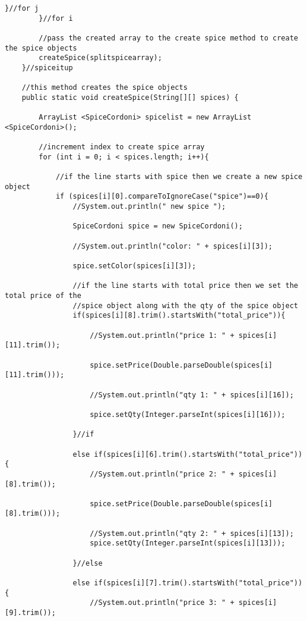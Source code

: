 \documentclass[letterpaper, 10pt,DIV=13]{scrartcl}
\numberwithin{equation}{section} %
\numberwithin{figure}{section} %
\numberwithin{table}{section} %
\begin{document}
\begin{lstlisting}[frame=single, ]
            }//for j
        }//for i

        //pass the created array to the create spice method to create the spice objects
        createSpice(splitspicearray);
    }//spiceitup

    //this method creates the spice objects
    public static void createSpice(String[][] spices) {

        ArrayList <SpiceCordoni> spicelist = new ArrayList <SpiceCordoni>();

        //increment index to create spice array
        for (int i = 0; i < spices.length; i++){

            //if the line starts with spice then we create a new spice object
            if (spices[i][0].compareToIgnoreCase("spice")==0){
                //System.out.println(" new spice ");

                SpiceCordoni spice = new SpiceCordoni();

                //System.out.println("color: " + spices[i][3]);

                spice.setColor(spices[i][3]);

                //if the line starts with total price then we set the total price of the 
                //spice object along with the qty of the spice object
                if(spices[i][8].trim().startsWith("total_price")){
                    
                    //System.out.println("price 1: " + spices[i][11].trim());

                    spice.setPrice(Double.parseDouble(spices[i][11].trim()));

                    //System.out.println("qty 1: " + spices[i][16]);

                    spice.setQty(Integer.parseInt(spices[i][16]));

                }//if

                else if(spices[i][6].trim().startsWith("total_price")){
                    //System.out.println("price 2: " + spices[i][8].trim());

                    spice.setPrice(Double.parseDouble(spices[i][8].trim()));

                    //System.out.println("qty 2: " + spices[i][13]);
                    spice.setQty(Integer.parseInt(spices[i][13]));

                }//else

                else if(spices[i][7].trim().startsWith("total_price")){
                    //System.out.println("price 3: " + spices[i][9].trim());


\end{lstlisting}
\end{document}
